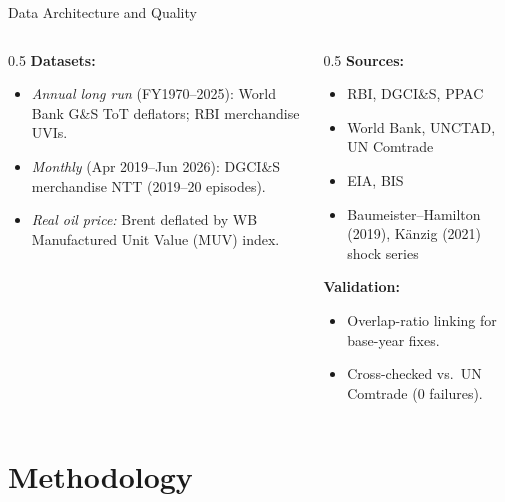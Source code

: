 \documentclass[10pt,aspectratio=169]{beamer}
\begin{document}
\begin{frame}{Data Architecture and Quality}
  \begin{columns}[T]
    \begin{column}{0.5\textwidth}
      \textbf{Datasets:}
      \begin{itemize}
        \item \textit{Annual long run} (FY1970--2025): World Bank G\&S ToT deflators; RBI merchandise UVIs.
        \item \textit{Monthly} (Apr 2019--Jun 2026): DGCI\&S merchandise NTT (2019--20 episodes).
        \item \textit{Real oil price:} Brent deflated by WB Manufactured Unit Value (MUV) index.
      \end{itemize}
    \end{column}
    \begin{column}{0.5\textwidth}
      \textbf{Sources:}
      \begin{itemize}
        \item RBI, DGCI\&S, PPAC
        \item World Bank, UNCTAD, UN Comtrade
        \item EIA, BIS
        \item Baumeister--Hamilton (2019), K\"anzig (2021) shock series
      \end{itemize}
      \vspace{0.3cm}
      \textbf{Validation:}
      \begin{itemize}
        \item Overlap-ratio linking for base-year fixes.
        \item Cross-checked vs.\ UN Comtrade (0 failures).
      \end{itemize}
    \end{column}
  \end{columns}
\end{frame}

\section{Methodology}
\end{document}
